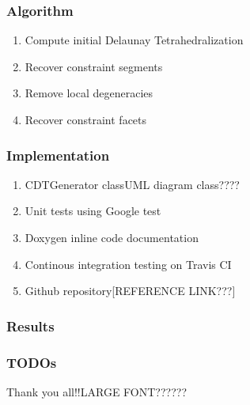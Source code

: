 \documentclass{beamer}
\begin{document}
	\begin{frame}
		\frametitle{Algorithm} 
			\begin{enumerate}
				\item Compute initial Delaunay Tetrahedralization	
				\item Recover constraint segments
				\item Remove local degeneracies
				\item Recover constraint facets
			\end{enumerate}		
	\end{frame}
	\begin{frame}
		\frametitle{Implementation}
			\begin{enumerate}
				\item CDTGenerator class{UML diagram class????}
				\item Unit tests using Google test
				\item Doxygen inline code documentation
				\item Continous integration testing on Travis CI	
				\item Github repository[REFERENCE LINK???]	
			\end{enumerate}
	\end{frame}	
	\begin{frame}
		\frametitle{Results} 	
	\end{frame}	
	\begin{frame}
		\frametitle{TODOs}	
	\end{frame}	
	\begin{frame}
		Thank you all!!{LARGE FONT??????}
	\end{frame}	
\end{document}
